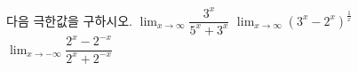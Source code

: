 다음 극한값을 구하시오.
 $\displaystyle\lim_{x\to\infty}\dfrac{3^x}{5^x+3^x}$
 $\displaystyle\lim_{x\to\infty}(3^x-2^x)^{\frac{1}{x}}$
 $\displaystyle\lim_{x\to -\infty}\dfrac{2^x-2^{-x}}{2^x+2^{-x}}$
